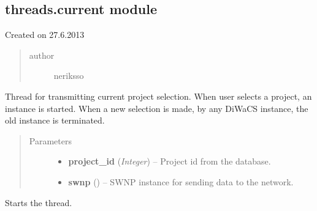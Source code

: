 \documentclass[letterpaper,10pt,english]{sphinxmanual}
\begin{document}
\subsection{threads.current module}
\label{threads:threads-current-module}\label{threads:module-threads.current}
Created on 27.6.2013
\begin{quote}\begin{description}
\item[{author}] \leavevmode
neriksso

\end{description}\end{quote}

\begin{fulllineitems}
\label{threads:threads.current.CURRENT_PROJECT}
Thread for transmitting current project selection.
When user selects a project, an instance is started.
When a new selection is made, by any DiWaCS instance,
the old instance is terminated.
\begin{quote}\begin{description}
\item[{Parameters}] \leavevmode\begin{itemize}
\item {} 
\textbf{project\_id} (\emph{Integer}) -- Project id from the database.

\item {} 
\textbf{swnp} ({\hyperref[swnp:swnp.SWNP]{}}) -- SWNP instance for sending data to the network.

\end{itemize}

\end{description}\end{quote}

\begin{fulllineitems}
\label{threads:threads.current.CURRENT_PROJECT.run}
Starts the thread.

\end{fulllineitems}


\end{fulllineitems}

\end{document}
